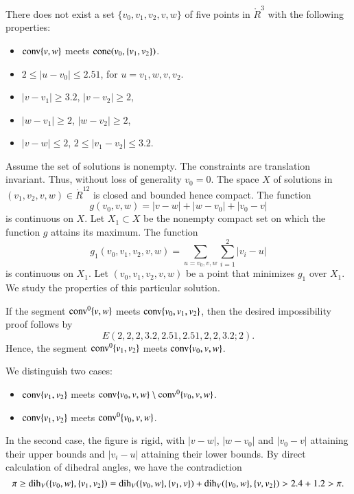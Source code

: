 \begin{tarskidata}
\begin{tarski}
\begin{lemma}
  There does not exist a set $\{v_0,v_1,v_2,v,w\}$ of five points
in $\ring{R}^3$ with the following properties:
\begin{itemize}
  \item ${\operatorname{conv}}\{v,w\}$ meets ${\operatorname{cone}}(v_0,\{v_1,v_2\})$.
  \item $2\le |u-v_0| \le 2.51$, for $u=v_1,w,v,v_2$.
    \item $|v-v_1|\ge 3.2$,  $|v-v_2|\ge 2$,
    \item $|w-v_1|\ge2$, $|w-v_2|\ge2$,
    \item   $|v-w|\le2$, $2\le |v_1-v_2|\le 3.2$.
\end{itemize}
\end{lemma}

\begin{proved} Assume the set of solutions is nonempty.  The constraints are
translation invariant.  Thus, without loss of generality $v_0=0$.  The space $X$
of solutions in $(v_1,v_2,v,w)\in\ring{R}^{12}$ 
is closed and bounded hence compact.  The function
$$
   g(v_0,v,w) = |v-w| + |w-v_0| + |v_0-v|
$$
is continuous on $X$.  Let $X_1\subset X$ be the nonempty compact set on which
the function $g$ attains its maximum.
The function
$$
   g_1(v_0,v_1,v_2,v,w) = \sum_{u = v_0,v,w}\sum_{i=1}^2 |v_i-u|
$$
is continuous on $X_1$.  Let $(v_0,v_1,v_2,v,w)$ be a point that
minimizes $g_1$ over $X_1$.  We study the properties of this particular solution.

If the segment ${\operatorname{conv}}^0\{v,w\}$ meets ${\operatorname{conv}}\{v_0,v_1,v_2\}$,
then the desired impossibility proof follows by
   $$
   E(2,2,2,  3.2,2.51,2.51,  2,2, 3.2; 2).
   $$
Hence, the segment ${\operatorname{conv}}^0\{v_1,v_2\}$ 
meets ${\operatorname{conv}}\{v_0,v,w\}$.

We distinguish two cases:
\begin{itemize}
\item ${\operatorname{conv}}\{v_1,v_2\}$ meets ${\operatorname{conv}}\{v_0,v,w\}\setminus {\operatorname{conv}}^0\{v_0,v,w\}$.
\item ${\operatorname{conv}}\{v_1,v_2\}$ meets ${\operatorname{conv}}^0\{v_0,v,w\}$.
\end{itemize}
In the second case, the figure is rigid, with $|v-w|$, $|w-v_0|$ and $|v_0-v|$ attaining
their upper bounds and $|v_i-u|$ attaining their lower bounds.  By direct calculation of
dihedral angles, we have the contradiction
$$
\pi\ge \operatorname{dih}_V(\{v_0,w\},\{v_1,v_2\})= \operatorname{dih}_V(\{v_0,w\},\{v_1,v\})+ \operatorname{dih}_V(\{v_0,w\},\{v,v_2\})
> 2.4+1.2 >\pi.
$$


\end{proved}
\end{tarski}
\end{tarskidata}

